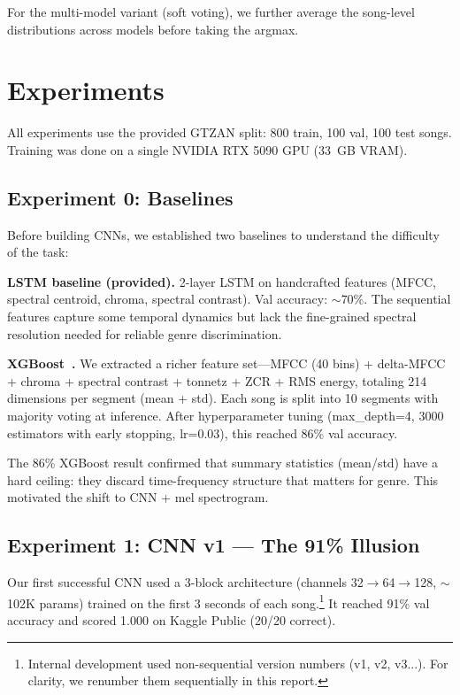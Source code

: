 For the multi-model variant (soft voting), we further average the song-level distributions across models before taking the argmax.

\section{Experiments}

All experiments use the provided GTZAN split: 800 train, 100 val, 100 test songs. Training was done on a single NVIDIA RTX 5090 GPU (33~GB VRAM).

\subsection{Experiment 0: Baselines}

Before building CNNs, we established two baselines to understand the difficulty of the task:

\textbf{LSTM baseline (provided).} 2-layer LSTM on handcrafted features (MFCC, spectral centroid, chroma, spectral contrast). Val accuracy: $\sim$70\%. The sequential features capture some temporal dynamics but lack the fine-grained spectral resolution needed for reliable genre discrimination.

\textbf{XGBoost~\cite{chen2016xgboost}.} We extracted a richer feature set---MFCC (40 bins) + delta-MFCC + chroma + spectral contrast + tonnetz + ZCR + RMS energy, totaling 214 dimensions per segment (mean + std). Each song is split into 10 segments with majority voting at inference. After hyperparameter tuning (max\_depth=4, 3000 estimators with early stopping, lr=0.03), this reached 86\% val accuracy.

The 86\% XGBoost result confirmed that summary statistics (mean/std) have a hard ceiling: they discard time-frequency structure that matters for genre. This motivated the shift to CNN + mel spectrogram.

\subsection{Experiment 1: CNN v1 --- The 91\% Illusion}

Our first successful CNN used a 3-block architecture (channels 32$\to$64$\to$128, $\sim$102K params) trained on the first 3 seconds of each song.\footnote{Internal development used non-sequential version numbers (v1, v2, v3...). For clarity, we renumber them sequentially in this report.} It reached 91\% val accuracy and scored 1.000 on Kaggle Public (20/20 correct).


